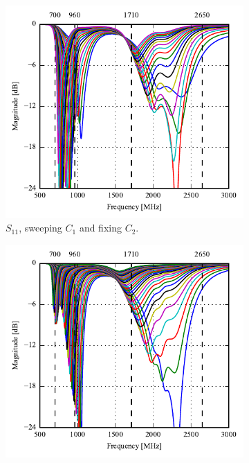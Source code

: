 \begin{figure}[htbp]
   \begin{subfigure}[b]{0.49\linewidth}
        \centering
        \includegraphics{img/tech_sol/monopole/5mm/sim/sweep_s11}
        \caption{$S_{11}$, sweeping $C_1$ and fixing $C_2$.}
    \end{subfigure}
    \hfill
    \begin{subfigure}[b]{0.49\linewidth}
        \centering
        \includegraphics{img/tech_sol/monopole/5mm/sim/sweep_S22_12p}

\end{subfigure}
\end{figure}
